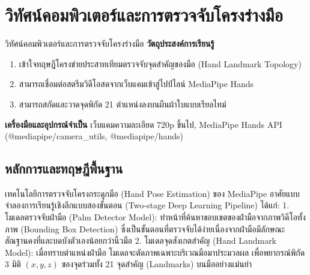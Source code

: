 
\chapter{วิทัศน์คอมพิวเตอร์และการตรวจจับโครงร่างมือ}
\label{ch:lab02}


\vspace{0.4cm}

\begin{labobjectivebox}{วิทัศน์คอมพิวเตอร์และการตรวจจับโครงร่างมือ}
\textbf{วัตถุประสงค์การเรียนรู้}
\begin{enumerate}[leftmargin=1.8cm, itemsep=2pt]
    \item เข้าใจทฤษฎีโครงข่ายประสาทเทียมตรวจจับจุดสำคัญของมือ (Hand Landmark Topology)
    \item สามารถเชื่อมต่อสตรีมวิดีโอสดจากเว็บแคมเข้าสู่ไปป์ไลน์ MediaPipe Hands
    \item สามารถสกัดและวาดจุดพิกัด 21 ตำแหน่งลงบนผืนผ้าใบแบบเรียลไทม์
\end{enumerate}

\vspace{4pt}
\textbf{เครื่องมือและอุปกรณ์จำเป็น} \enspace เว็บแคมความละเอียด 720p ขึ้นไป, MediaPipe Hands API (@mediapipe/camera\_utils, @mediapipe/hands)
\end{labobjectivebox}

\section{หลักการและทฤษฎีพื้นฐาน}

เทคโนโลยีการตรวจจับโครงกระดูกมือ (Hand Pose Estimation) ของ MediaPipe อาศัยแบบจำลองการเรียนรู้เชิงลึกแบบสองขั้นตอน (Two-stage Deep Learning Pipeline) ได้แก่:
1. โมเดลตรวจจับฝ่ามือ (Palm Detector Model): ทำหน้าที่ค้นหาขอบเขตของฝ่ามือจากภาพวิดีโอทั้งภาพ (Bounding Box Detection) ซึ่งเป็นขั้นตอนที่ตรวจจับได้ง่ายเนื่องจากฝ่ามือมีลักษณะสัณฐานคงที่และบดบังตัวเองน้อยกว่านิ้วมือ
2. โมเดลจุดสังเกตสำคัญ (Hand Landmark Model): เมื่อทราบตำแหน่งฝ่ามือ โมเดลจะตัดภาพเฉพาะบริเวณมือมาประมวลผล เพื่อพยากรณ์พิกัด 3 มิติ $(x, y, z)$ ของจุดร่วมทั้ง 21 จุดสำคัญ (Landmarks) บนมืออย่างแม่นยำ

